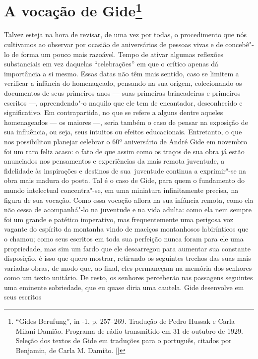 \chapter{A vocação de Gide\footnote[*]{``Gides Berufung'', in -1, p. 257--269. Tradução de Pedro
  Hussak e Carla Milani Damião. Programa de rádio transmitido em 31 de outubro de 1929. Seleção dos textos de Gide
  em traduções para o português, citados por Benjamin, de Carla M. Damião. []}}

Talvez esteja na hora de revisar, de uma vez por todas, o procedimento que nós cultivamos ao observar por ocasião de aniversários de pessoas vivas e de concebê"-lo de
forma um pouco mais razoável. Tempo de ativar algumas reflexões
substanciais em vez daquelas ``celebrações'' em que o crítico apenas
dá importância a si mesmo. Essas datas não têm mais sentido, caso se limitem a verificar a infância do homenageado, pensando na sua origem, colecionando os documentos de seus primeiros anos --- suas primeiras brincadeiras e primeiros escritos ---, apreendendo"-o naquilo que ele tem de encantador, desconhecido e significativo. Em
contrapartida, no que se refere a alguns dentre aqueles homenageados --- os maiores ---,
seria também o caso de pensar na exposição de sua influência, ou seja, seus intuitos ou
efeitos educacionais. Entretanto, o que nos possibilitou planejar celebrar o 60º aniversário de André Gide em novembro foi um raro feliz acaso: o fato de que assim como os traços de sua
obra já estão anunciados nos pensamentos e experiências da mais remota
juventude, a fidelidade às inspirações e destinos de sua~juventude continua a exprimir"-se na obra mais madura do poeta.
Tal é o caso de Gide, para quem o
fundamento do mundo intelectual concentra"-se,
em uma miniatura infinitamente precisa, na figura de sua vocação. Como essa
vocação aflora na sua infância remota, como ela não cessa de
acompanhá"-lo na juventude e na vida adulta: como ela nem sempre foi um grande e
patético imperativo, mas frequentemente uma perigosa voz vagante do
espírito da montanha vindo de maciços montanhosos
labirínticos que o chamou; como seus escritos em toda sua perfeição nunca foram para
ele uma propriedade, mas sim um fardo que ele descarregou para aumentar
sua constante disposição, é isso que quero mostrar, retirando os seguintes trechos das
suas mais variadas obras, de modo que, ao final,
eles permaneçam na memória dos senhores como um texto unitário. De
resto, os senhores perceberão nas passagens seguintes uma eminente
sobriedade, que eu quase diria uma cautela. Gide desenvolve em seus escritos
